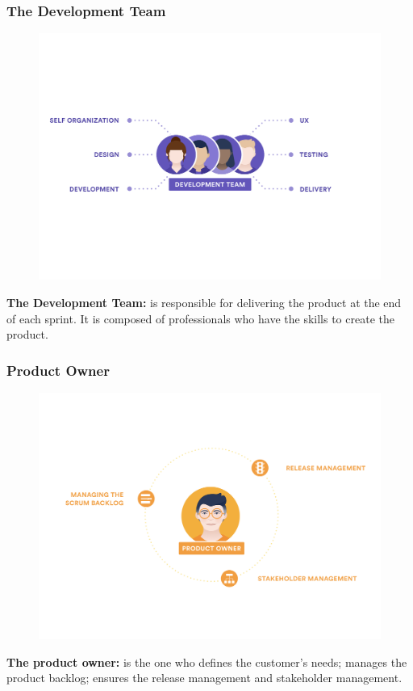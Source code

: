 \documentclass[
	11pt, %
]{beamer}
\begin{document}
\begin{frame}
	\frametitle{The Development Team}
	\begin{figure}
		\centering
		\includegraphics[width=0.7\linewidth]{Scrum-Development Team-revised.png}
	\end{figure}
	\tiny
	\textbf{The Development Team:} is responsible for delivering the product at the end of each sprint. It is composed of professionals who have the skills to create the product.
\end{frame}


\begin{frame}
	\frametitle{Product Owner}
	\begin{figure}
		\centering
		\includegraphics[width=0.7\linewidth]{Scrum-Product Owner-revised.png}
	\end{figure}
	\tiny
	\textbf{The product owner:} is the one who defines the customer's needs; manages the product backlog; ensures the release management and stakeholder management.
\end{frame}
\end{document}
